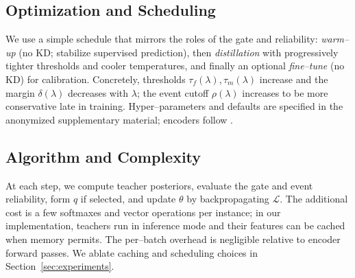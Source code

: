 \subsection{Optimization and Scheduling}
We use a simple schedule that mirrors the roles of the gate and reliability:
\emph{warm–up} (no KD; stabilize supervised prediction), then \emph{distillation} with progressively tighter thresholds and cooler temperatures, and finally an optional \emph{fine–tune} (no KD) for calibration. Concretely, thresholds \(\tau_f(\lambda),\tau_m(\lambda)\) increase and the margin \(\delta(\lambda)\) decreases with \(\lambda\); the event cutoff \(\rho(\lambda)\) increases to be more conservative late in training. Hyper–parameters and defaults are specified in the anonymized supplementary material; encoders follow \citet{Devlin2019BERT,Dosovitskiy2020ViT}.

\subsection{Algorithm and Complexity}
At each step, we compute teacher posteriors, evaluate the gate and event reliability, form \(q\) if selected, and update \(\theta\) by backpropagating \(\mathcal{L}\). The additional cost is a few softmaxes and vector operations per instance; in our implementation, teachers run in inference mode and their features can be cached when memory permits. The per–batch overhead is negligible relative to encoder forward passes. We ablate caching and scheduling choices in Section~\ref{sec:experiments}.

